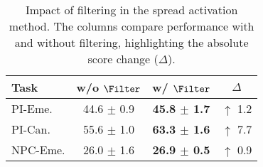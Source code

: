 \begin{table}[t!]
    \centering
    \begin{tabular}{lccc}
        \toprule
        \textbf{Task} & w/o $\Filter$ & w/ $\Filter$ & $\Delta$ \\
        \midrule
        PI-Eme. & 44.6 $\pm$ 0.9 &\textbf{45.8 $\pm$ 1.7} & $\uparrow$ 1.2\\
        PI-Can. & 55.6 $\pm$ 1.0 &\textbf{63.3 $\pm$ 1.6}  & $\uparrow$ 7.7\\
        NPC-Eme. & 26.0 $\pm$ 1.6 & \textbf{26.9 $\pm$ 0.5}  & $\uparrow$ 0.9\\
        \bottomrule
    \end{tabular}
    \caption{Impact of filtering in the spread activation method. The columns compare performance with and without filtering, highlighting the absolute score change ($\Delta$).}
    \label{iteration_sa_performance}
\end{table}